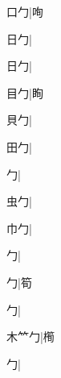 \begin{multicols}{2}
{{\cjk{}{\cnsym{}　}口勹}\mktsJzrVerticalBar{}{\cjk{}{\cnsym{}　}{\cnsym{}　}{\cnsym{}　}}|{\cjk{}咰}\par
{\cjk{}{\cnsym{}　}日勹}\mktsJzrVerticalBar{}{\cjk{}{\cnsym{}　}{\cnsym{}　}{\cnsym{}　}}|{}\par
{日勹}|{}\par
{\cjk{}{\cnsym{}　}目勹}\mktsJzrVerticalBar{}{\cjk{}{\cnsym{}　}{\cnsym{}　}{\cnsym{}　}}|{\cjk{}眴}\par
{\cjk{}{\cnsym{}　}貝勹}\mktsJzrVerticalBar{}{\cjk{}{\cnsym{}　}{\cnsym{}　}{\cnsym{}　}}|{}\par
{\cjk{}{\cnsym{}　}田勹}\mktsJzrVerticalBar{}{\cjk{}{\cnsym{}　}{\cnsym{}　}{\cnsym{}　}}|{}\par
{勹}\mktsJzrVerticalBar{}{\cjk{}{\cnsym{}　}{\cnsym{}　}{\cnsym{}　}}|{}\par
{\cjk{}{\cnsym{}　}虫勹}\mktsJzrVerticalBar{}{\cjk{}{\cnsym{}　}{\cnsym{}　}{\cnsym{}　}}|{}\par
{\cjk{}{\cnsym{}　}巾勹}\mktsJzrVerticalBar{}{\cjk{}{\cnsym{}　}{\cnsym{}　}{\cnsym{}　}}|{}\par
{勹}\mktsJzrVerticalBar{}{\cjk{}{\cnsym{}　}{\cnsym{}　}{\cnsym{}　}}|{}\par
{勹}\mktsJzrVerticalBar{}{\cjk{}{\cnsym{}　}{\cnsym{}　}{\cnsym{}　}}|{\cjk{}筍}\par
{勹}\mktsJzrVerticalBar{}{\cjk{}{\cnsym{}　}{\cnsym{}　}{\cnsym{}　}}|{}\par
{\cjk{}木{\cnxb{}𥫗}勹}\mktsJzrVerticalBar{}{\cjk{}{\cnsym{}　}{\cnsym{}　}{\cnsym{}　}}|{\cjk{}橁}\par
{勹}\mktsJzrVerticalBar{}{\cjk{}{\cnsym{}　}{\cnsym{}　}{\cnsym{}　}}|{}\par
}
\end{multicols}
